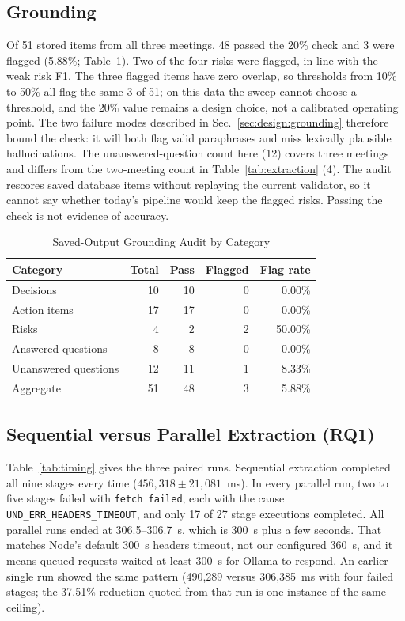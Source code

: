 \documentclass[conference]{IEEEtran}
\begin{document}
\subsection{Grounding}
\label{sec:grounding}
Of 51 stored items from all three meetings, 48 passed the 20\% check and 3 were flagged (5.88\%; Table~\ref{tab:grounding}). Two of the four risks were flagged, in line with the weak risk F1. The three flagged items have zero overlap, so thresholds from 10\% to 50\% all flag the same 3 of 51; on this data the sweep cannot choose a threshold, and the 20\% value remains a design choice, not a calibrated operating point. The two failure modes described in Sec.~\ref{sec:design:grounding} therefore bound the check: it will both flag valid paraphrases and miss lexically plausible hallucinations. The unanswered-question count here (12) covers three meetings and differs from the two-meeting count in Table~\ref{tab:extraction} (4). The audit rescores saved database items without replaying the current validator, so it cannot say whether today's pipeline would keep the flagged risks. Passing the check is not evidence of accuracy.

\begin{table}[!t]
\caption{Saved-Output Grounding Audit by Category}
\label{tab:grounding}
\centering
\footnotesize
\begin{tabular}{lrrrr}
\toprule
\textbf{Category} & \textbf{Total} & \textbf{Pass} & \textbf{Flagged} & \textbf{Flag rate}\\
\midrule
Decisions & 10 & 10 & 0 & 0.00\%\\
Action items & 17 & 17 & 0 & 0.00\%\\
Risks & 4 & 2 & 2 & 50.00\%\\
Answered questions & 8 & 8 & 0 & 0.00\%\\
Unanswered questions & 12 & 11 & 1 & 8.33\%\\
\midrule
Aggregate & 51 & 48 & 3 & 5.88\%\\
\bottomrule
\end{tabular}
\end{table}

\subsection{Sequential versus Parallel Extraction (RQ1)}
\label{sec:proc}
Table~\ref{tab:timing} gives the three paired runs. Sequential extraction completed all nine stages every time ($456{,}318\pm21{,}081$~ms). In every parallel run, two to five stages failed with \texttt{fetch failed}, each with the cause \texttt{UND\_ERR\_HEADERS\_TIMEOUT}, and only 17 of 27 stage executions completed. All parallel runs ended at 306.5--306.7~s, which is 300~s plus a few seconds. That matches Node's default 300~s headers timeout, not our configured 360~s, and it means queued requests waited at least 300~s for Ollama to respond. An earlier single run showed the same pattern (490,289 versus 306,385~ms with four failed stages; the 37.51\% reduction quoted from that run is one instance of the same ceiling).
\end{document}

